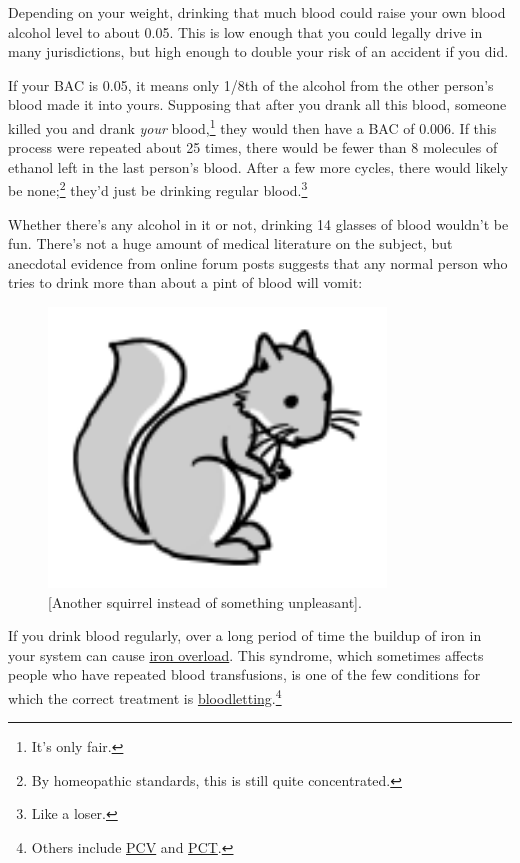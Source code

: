 {{Depending on your weight, drinking that much blood could raise your own blood alcohol level to about 0.05. This is low enough that you could legally drive in many jurisdictions, but high enough to double your risk of an accident if you did.}

{If your BAC is 0.05, it means only 1/8th of the alcohol from the other person's blood made it into yours. Supposing that after you drank all this blood, someone killed you and drank \emph{your} blood,{\footnote{It's only fair.} } they would then have a BAC of 0.006. If this process were repeated about 25 times, there would be fewer than 8 molecules of ethanol left in the last person's blood. After a few more cycles, there would likely be none;{\footnote{By homeopathic standards, this is still quite concentrated.} } they'd just be drinking regular blood.{\footnote{Like a loser.} } }

{Whether there's any alcohol in it or not, drinking 14 glasses of blood wouldn't be fun. There's not a huge amount of medical literature on the subject, but anecdotal evidence from online forum posts suggests that any normal person who tries to drink more than about a pint of blood will vomit:}

\begin{figure}[!htbp]
\centering
\includegraphics[scale=0.5, max width=0.8\textwidth]{imgs/a/98/squirrel_2.png}
\caption{[Another squirrel instead of something unpleasant].}
\end{figure}

{If you drink blood regularly, over a long period of time the buildup of iron in your system can cause \href{http://en.wikipedia.org/wiki/Iron\_overload}{iron overload}. This syndrome, which sometimes affects people who have repeated blood transfusions, is one of the few conditions for which the correct treatment is \href{http://en.wikipedia.org/wiki/Bloodletting}{bloodletting}.{\footnote{Others include \href{http://en.wikipedia.org/wiki/Polycythemia\_vera}{PCV} and \href{http://en.wikipedia.org/wiki/Porphyria\_cutanea\_tarda} {PCT}.} } }

}
